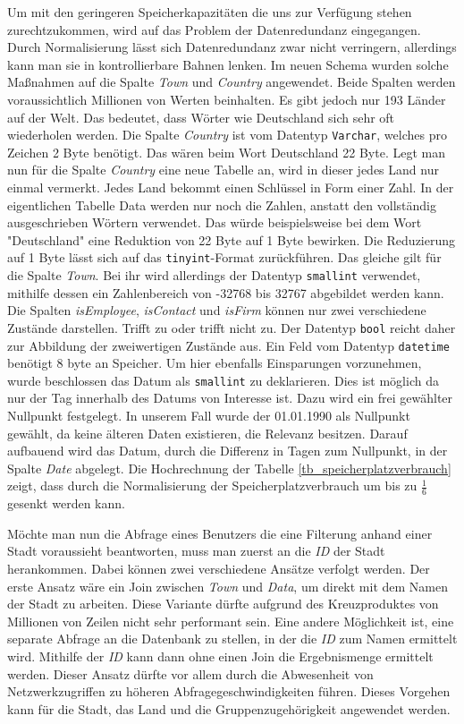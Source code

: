 Um mit den geringeren Speicherkapazitäten die uns zur Verfügung stehen zurechtzukommen, wird auf das Problem der Datenredundanz eingegangen. Durch Normalisierung lässt sich Datenredundanz zwar nicht verringern, allerdings kann man sie in kontrollierbare Bahnen lenken. Im neuen Schema wurden solche Maßnahmen auf die Spalte \textit{Town} und \textit{Country} angewendet. Beide Spalten werden voraussichtlich Millionen von Werten beinhalten. Es gibt jedoch nur 193 Länder auf der Welt. Das bedeutet, dass Wörter wie Deutschland sich sehr oft wiederholen werden. Die Spalte \textit{Country} ist vom Datentyp \texttt{Varchar}, welches pro Zeichen 2 Byte benötigt. Das wären beim Wort Deutschland 22 Byte. Legt man nun für die Spalte \textit{Country} eine neue Tabelle an, wird in dieser jedes Land nur einmal vermerkt. Jedes Land bekommt einen Schlüssel in Form einer Zahl. In der eigentlichen Tabelle Data werden nur noch die Zahlen, anstatt den vollständig ausgeschrieben Wörtern verwendet. Das würde beispielsweise bei dem Wort "Deutschland" eine Reduktion von 22 Byte auf 1 Byte bewirken. Die Reduzierung auf 1 Byte lässt sich auf das \texttt{tinyint}-Format zurückführen. Das gleiche gilt für die Spalte \textit{Town}. Bei ihr wird allerdings der Datentyp \texttt{smallint} verwendet, mithilfe dessen ein Zahlenbereich von -32768 bis 32767 abgebildet werden kann. Die Spalten \textit{isEmployee}, \textit{isContact} und \textit{isFirm} können nur zwei verschiedene Zustände darstellen. Trifft zu oder trifft nicht zu. Der Datentyp \texttt{bool} reicht daher zur Abbildung der zweiwertigen Zustände aus. Ein Feld vom Datentyp \texttt{datetime} benötigt 8 byte an Speicher. Um hier ebenfalls Einsparungen vorzunehmen, wurde beschlossen das Datum als \texttt{smallint} zu deklarieren. Dies ist möglich da nur der Tag innerhalb des Datums von Interesse ist. Dazu wird ein frei gewählter Nullpunkt festgelegt. In unserem Fall wurde der 01.01.1990 als Nullpunkt gewählt, da keine älteren Daten existieren, die Relevanz besitzen. Darauf aufbauend wird das Datum, durch die Differenz in Tagen zum Nullpunkt, in der Spalte \textit{Date} abgelegt. Die Hochrechnung der Tabelle \ref{tb_speicherplatzverbrauch} zeigt, dass durch die Normalisierung der Speicherplatzverbrauch um bis zu $ \frac{1}{6} $ gesenkt werden kann.


Möchte man nun die Abfrage eines Benutzers die eine Filterung anhand einer Stadt voraussieht beantworten, muss man zuerst an die \textit{ID} der Stadt herankommen. Dabei können zwei verschiedene Ansätze verfolgt werden. Der erste Ansatz wäre ein Join zwischen \textit{Town} und \textit{Data}, um direkt mit dem Namen der Stadt zu arbeiten. Diese Variante dürfte aufgrund des Kreuzproduktes von Millionen von Zeilen nicht sehr performant sein. Eine andere Möglichkeit ist, eine separate Abfrage an die Datenbank zu stellen, in der die \textit{ID} zum Namen ermittelt wird. Mithilfe der \textit{ID} kann dann ohne einen Join die Ergebnismenge ermittelt werden. Dieser Ansatz dürfte vor allem durch die Abwesenheit von Netzwerkzugriffen zu höheren Abfragegeschwindigkeiten führen. Dieses Vorgehen kann für die Stadt, das Land und die Gruppenzugehörigkeit angewendet werden.

